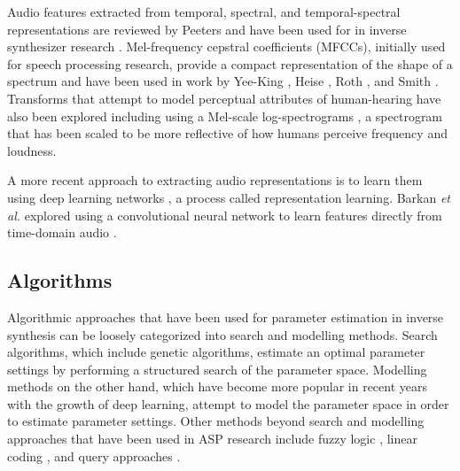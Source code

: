 Audio features extracted from temporal, spectral, and temporal-spectral representations are reviewed by Peeters \cite{peeters2004large} and have been used for in inverse synthesizer research \cite{mintz2007toward, stowell2010making, mcartwright2014, blancas2014sound}. Mel-frequency cepstral coefficients (MFCCs), initially used for speech processing research, provide a compact representation of the shape of a spectrum and have been used in work by Yee-King \cite{yee2008synthbot}, Heise \cite{ heise2009automatic}, Roth \cite{roth2011comparison}, and Smith \cite{smith2017play}. Transforms that attempt to model perceptual attributes of human-hearing have also been explored including using a Mel-scale log-spectrograms \cite{zhang2018visualization}, a spectrogram that has been scaled to be more reflective of how humans perceive frequency and loudness.

A more recent approach to extracting audio representations is to learn them using deep learning networks \cite{bengio2013representation}, a process called representation learning. Barkan \textit{et al.} explored using a convolutional neural network to learn features directly from time-domain audio \cite{barkan2019inversynth}.


\subsection{Algorithms}
Algorithmic approaches that have been used for parameter estimation in inverse synthesis can be loosely categorized into search and modelling methods. Search algorithms, which include genetic algorithms, estimate an optimal parameter settings by performing a structured search of the parameter space. Modelling methods on the other hand, which have become more popular in recent years with the growth of deep learning, attempt to model the parameter space in order to estimate parameter settings. Other methods beyond search and modelling approaches that have been used in ASP research include fuzzy logic \cite{mitchell2005frequency, hamadicharef2012intelligent}, linear coding \cite{mintz2007toward}, and query approaches \cite{mcartwright2014}.

